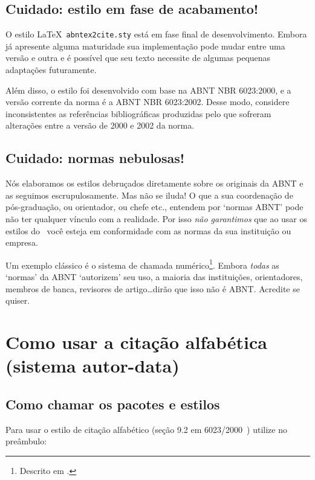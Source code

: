 \documentclass[a4paper]{ltxdoc}
\begin{document}
\subsection{Cuidado: estilo em fase de acabamento!}

O estilo \LaTeX\ {\tt abntex2cite.sty} está em fase final de desenvolvimento.
Embora já apresente alguma maturidade sua implementação pode mudar entre uma
versão e outra e é possível que seu texto necessite de algumas pequenas
adaptações futuramente.

Além disso, o estilo foi desenvolvido com base na ABNT NBR 6023:2000, e a versão
corrente da norma é a ABNT NBR 6023:2002. Desse modo, considere inconsistentes
as referências bibliográficas produzidas pelo  que sofreram alterações
entre a versão de 2000 e 2002 da norma.


\subsection{Cuidado: normas nebulosas!}

Nós elaboramos os estilos debruçados diretamente sobre os originais da ABNT
e as seguimos escrupulosamente. Mas não se iluda! O que a sua coordenação
de pós-graduação, ou orientador, ou chefe etc., entendem por `normas ABNT'
pode não ter qualquer vínculo com a realidade. Por isso \emph{não garantimos}
que ao usar os estilos do \abnTeX\ você esteja em conformidade com as normas
da sua instituição ou empresa.

Um exemplo clássico é o sistema de chamada numérico\footnote{Descrito em
.}. Embora \emph{todas} as `normas' da ABNT
\cite{NBR10520:1988,NBR6023:2000,NBR6023:2002,NBR6023:2002,NBR10520:2001,NBR10520:2002}
`autorizem' seu uso, a maioria das instituições, orientadores, membros de banca,
revisores de artigo\ldots dirão que isso não é ABNT. Acredite se quiser.

\section{Como usar a citação alfabética (sistema autor-data)}

\subsection{Como chamar os pacotes e estilos}

\DescribeMacro{\usepackage[alf]{abntex2cite}}
Para usar o estilo de citação alfabético (seção 9.2 em
6023/2000~\cite{NBR6023:2000}) utilize no preâmbulo:
\end{document}
